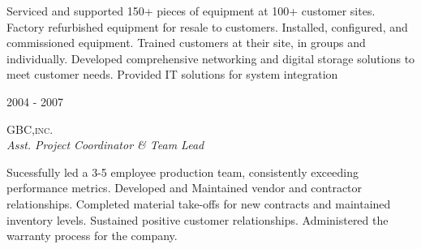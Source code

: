 \documentclass[11pt]{article} %
\begin{document}
\begin{minipage}[t]{0.5\textwidth}
\normalsize{Serviced and supported 150+ pieces of equipment at 100+ customer sites. Factory refurbished equipment for resale to customers. Installed, configured, and commissioned equipment. Trained customers at their site, in groups and individually. Developed comprehensive networking and digital storage solutions to meet customer needs. Provided IT solutions for system integration}\\


{\raggedleft\textsc{2004 - 2007}\par}

{\raggedright\large\textsc{GBC,inc.}\\
\textit{Asst. Project Coordinator \& Team Lead}\\[5pt]}

\normalsize{Sucessfully led a 3-5 employee production team, consistently exceeding performance metrics. Developed and Maintained vendor and contractor relationships. Completed material take-offs for new contracts and maintained inventory levels. Sustained positive customer relationships. Administered the warranty process for the company.}\\





\end{minipage} %
\hfill
\end{document}
